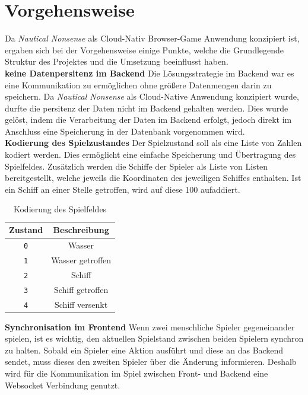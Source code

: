 \documentclass[a4paper, 10pt, conference]{IEEEtran}
\begin{document}
\section{Vorgehensweise}\label{sec:vorgehensweise}
Da \textit{Nautical Nonsense} als Cloud-Nativ Browser-Game Anwendung konzipiert ist, ergaben sich bei der Vorgehensweise einige Punkte, welche die Grundlegende Struktur des Projektes und die Umsetzung beeinflusst haben.\\

\textbf{keine Datenpersitenz im Backend} Die Lösungsstrategie im Backend war es eine Kommunikation zu ermöglichen ohne größere Datenmengen darin zu speichern. Da \textit{Nautical Nonsense} als Cloud-Native Anwendung konzipiert wurde, durfte die persitenz der Daten nicht im Backend gehalten werden. Dies wurde gelöst, indem die Verarbeitung der Daten im Backend erfolgt, jedoch direkt im Anschluss eine Speicherung in der Datenbank vorgenommen wird. \\

\textbf{Kodierung des Spielzustandes} 
Der Spielzustand soll als eine Liste von Zahlen kodiert werden. Dies ermöglicht eine einfache Speicherung und Übertragung des Spielfeldes. 
Zusätzlich werden die Schiffe der Spieler als Liste von Listen bereitgestellt, welche jeweils die Koordinaten des jeweiligen Schiffes enthalten. Ist ein Schiff an einer Stelle getroffen, wird auf diese 100 aufaddiert. \\

\begin{table}[h!]
    \begin{center}
        \caption{Kodierung des Spielfeldes}
        \label{tab:gamefield}
        \begin{tabular}{|c|c|}
            \textbf{Zustand} & \textbf{Beschreibung}\\
            \hline
            \texttt{0}	& Wasser\\
            \texttt{1}	& Wasser getroffen\\
            \texttt{2}	& Schiff\\
            \texttt{3}	& Schiff getroffen\\
            \texttt{4}	& Schiff versenkt\\
        \end{tabular}
    \end{center}
\end{table}

\textbf{Synchronisation im Frontend}
Wenn zwei menschliche Spieler gegeneinander spielen, ist es wichtig, den aktuellen Spielstand zwischen beiden Spielern synchron zu halten. Sobald ein Spieler eine Aktion ausführt und diese an das Backend sendet, muss dieses den zweiten Spieler über die Änderung informieren. Deshalb wird für die Kommunikation im Spiel zwischen Front- und Backend eine Websocket Verbindung genutzt.
\end{document}
